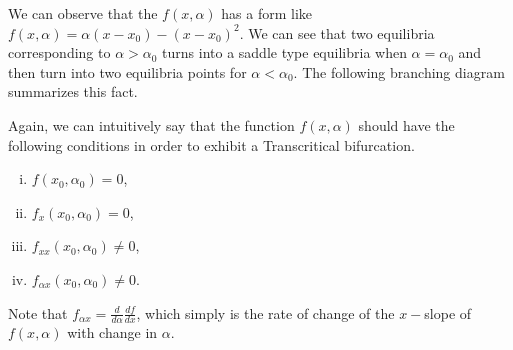 

We can observe that the $f(x,\alpha)$ has a form like $f(x,\alpha) = \alpha (x-x_0) - (x-x_0)^2$. We can see that two equilibria corresponding to $\alpha>\alpha_0$ turns into a saddle type equilibria when $\alpha = \alpha_0$ and then turn into two equilibria points for $\alpha<\alpha_0$. The following branching diagram summarizes this fact.



Again, we can intuitively say that the function $f(x,\alpha)$ should have the following conditions in order to exhibit a Transcritical bifurcation.

\begin{enumerate}[(i)]
	\item $f(x_0,\alpha_0) = 0$,
	\item $f_x(x_0,\alpha_0) = 0$,
	\item $f_{xx}(x_0,\alpha_0) \neq  0$,
	\item $f_{\alpha x} (x_0,\alpha_0) \neq 0$.
\end{enumerate}
Note that $f_{\alpha x} = \frac{d}{d\alpha} \frac{df}{dx}$, which simply is the rate of change of the $x-$slope of $f(x,\alpha)$ with change in $\alpha$.
